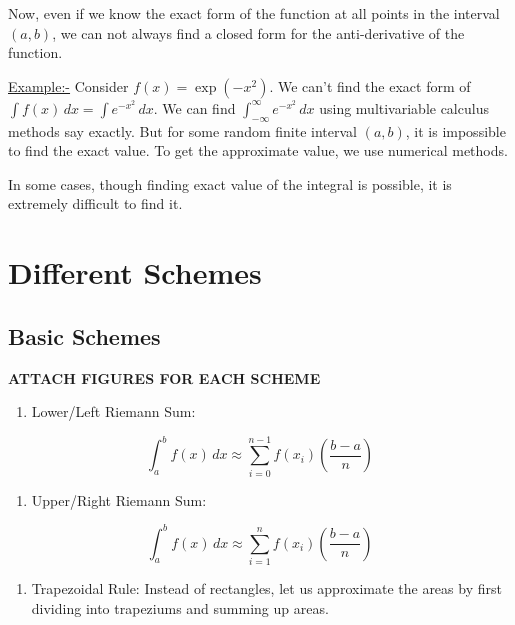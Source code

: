 \documentclass[
]{book}
\providecommand{\tightlist}{%
  \setlength{\itemsep}{0pt}\setlength{\parskip}{0pt}}
\begin{document}
Now, even if we know the exact form of the function at all points in the interval \((a,b)\), we can not always find a closed form for the anti-derivative of the function.

\url{Example:-} Consider \(f(x) = \exp(-x^2)\). We can't find the exact form of \(\int f(x)\, dx = \int e^{-x^2}\, dx\). We can find \(\int_{-\infty}^{\infty} e^{-x^2}\, dx\) using multivariable calculus methods say exactly. But for some random finite interval \((a,b)\), it is impossible to find the exact value. To get the approximate value, we use numerical methods.

In some cases, though finding exact value of the integral is possible, it is extremely difficult to find it.

\hypertarget{different-schemes}{%
\section{Different Schemes}\label{different-schemes}}

\hypertarget{basic-schemes}{%
\subsection{Basic Schemes}\label{basic-schemes}}

\textbf{ATTACH FIGURES FOR EACH SCHEME}

\begin{enumerate}
\def\labelenumi{\arabic{enumi}.}
\tightlist
\item
  Lower/Left Riemann Sum:
\end{enumerate}

\begin{equation}
\int_a^b f(x) \, dx \approx \sum_{i=0}^{n-1} f(x_i) \left( \frac{b-a}{n} \right)
\end{equation}

\begin{enumerate}
\def\labelenumi{\arabic{enumi}.}
\setcounter{enumi}{1}
\tightlist
\item
  Upper/Right Riemann Sum:
\end{enumerate}

\begin{equation}
\int_a^b f(x) \, dx \approx \sum_{i=1}^{n} f(x_i) \left( \frac{b-a}{n} \right)
\end{equation}

\begin{enumerate}
\def\labelenumi{\arabic{enumi}.}
\setcounter{enumi}{2}
\tightlist
\item
  Trapezoidal Rule:
  Instead of rectangles, let us approximate the areas by first dividing into trapeziums and summing up areas.
\end{enumerate}
\end{document}
